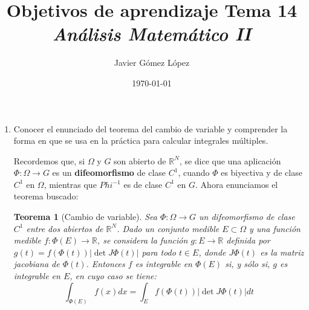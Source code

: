 \documentclass[a4paper, 12pt]{article}
\title{\textbf{Objetivos de aprendizaje Tema 14} \\ \textit{Análisis Matemático II}}
\author{Javier Gómez López}
\date{\today}
\newtheorem*{teorema*}{Teorema}
\begin{document}
\maketitle

\begin{enumerate}[label=\textbf{\arabic*}.]
	
	\item Conocer el enunciado del teorema del cambio de variable y comprender la forma en que se usa en la práctica para calcular integrales múltiples.
	
	Recordemos que, si \(\Omega\) y \(G\) son abierto de \(\mathbb{R}^N\), se dice que una aplicación \(\Phi : \Omega \to G\) es un \textbf{difeomorfismo} de clase \(C^1\), cuando \(\Phi\) es biyectiva y de clase \(C^1\) en \(\Omega\), mientras que \(Phi^{-1}\) es de clase \(C^1\) en \(G\). Ahora enunciamos el teorema buscado:
	
	\begin{teorema*}[Cambio de variable]
	Sea \(\Phi : \Omega \to G\) un difeomorfismo de clase \(C^1\) entre dos abiertos de \(\mathbb{R}^N\). Dado un conjunto medible \(E \subset \Omega\) y una función medible \(f: \Phi (E) \to \mathbb{R}\), se considera la función \(g: E \to \mathbb{R}\) definida por \(g(t) = f(\Phi (t)) |\det J \Phi (t)|\) para todo \(t \in E\), donde \(J \Phi (t)\) es la matriz jacobiana de \(\Phi (t)\). Entonces \(f\) es integrable en \(\Phi (E)\) si, y sólo si, \(g\) es integrable en \(E\), en cuyo caso se tiene:
	\[
		\int_{\Phi (E)} f(x) dx = \int_E f(\Phi(t)) |\det J \Phi (t)| dt
	\]
	\end{teorema*}
\end{enumerate}
\end{document}
